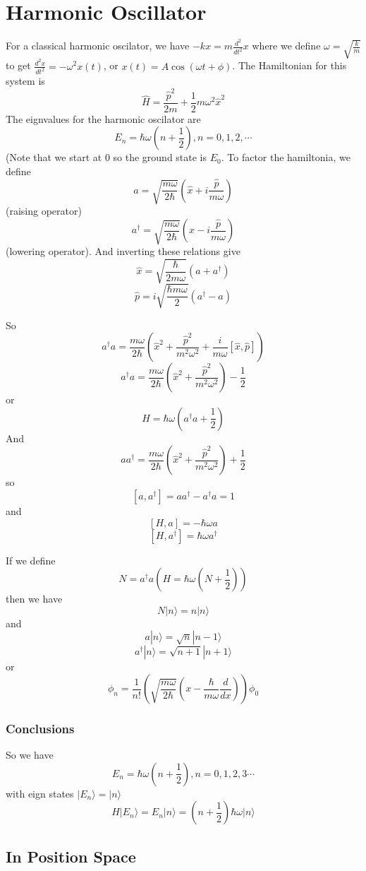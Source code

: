 \documentclass{homework}
\newcommand{\ket}[1]{| #1 \rangle}
\begin{document}
\section{Harmonic Oscillator}

For a classical harmonic oscilator, we have $-kx = m\frac{d^2}{dt^2}x$ where we define $\omega = \sqrt{\frac{k}{m}}$ to get $\frac{d^2x}{dt^2} = -\omega^2 x(t)$, or $x(t) = A\cos(\omega t + \phi)$. The Hamiltonian for this system is 
\[\hat{H} = \frac{\hat{p}^2}{2m} + \frac{1}{2}m\omega^2\hat{x}^2\]
The eignvalues for the harmonic oscilator are
\[E_n = \hbar \omega(n + \frac{1}{2}), n = 0,1,2, \cdots\]
(Note that we start at $0$ so the ground state is $E_0$. To factor the hamiltonia, we define
\[a = \sqrt{\frac{m\omega}{2\hbar}}(\hat{x} + i \frac{\hat{p}}{m\omega})\]
(raising operator)
\[a^{\dagger} = \sqrt{\frac{m\omega}{2\hbar}}(\hat{x} - i \frac{\hat{p}}{m\omega})\]
(lowering operator).  And inverting these relations give
\[\hat{x} = \sqrt{\frac{\hbar}{2m\omega}}(a + a^{\dagger})\]
\[\hat{p} = i\sqrt{\frac{\hbar m \omega}{2}}(a^{\dagger} - a)\]

So 
\[a^{\dagger}a = \frac{m\omega}{2 \hbar}(\hat{x}^2 + \frac{\hat{p}^2}{m^2\omega^2}+ \frac{i}{m\omega}[\hat{x},\hat{p}])\]
\[a^{\dagger}a = \frac{m\omega}{2 \hbar}(\hat{x}^2 + \frac{\hat{p}^2}{m^2\omega^2})  - \frac{1}{2}\]
or
\[H = \hbar \omega (a^{\dagger}a+ \frac{1}{2})\]
And 
\[aa^{\dagger} = \frac{m\omega}{2 \hbar}(\hat{x}^2 + \frac{\hat{p}^2}{m^2\omega^2})  + \frac{1}{2}\]
so
\[[a,a^{\dagger}] = aa^{\dagger} - a^{\dagger}a = 1\]
and
\[[H,a] = -\hbar \omega a\]
\[[H,a^{\dagger}] = \hbar \omega a^{\dagger}\]


If we define
\[N = a^{\dagger}a (H = \hbar \omega(N + \frac{1}{2}))\]
then we have
\[N\ket{n} = n\ket{n}\]
and
\[a\ket{n} = \sqrt{n}\ket{n   - 1}\]
\[a^{\dagger}\ket{n} = \sqrt{n+1}\ket{n  +1}\]
or 
\[\phi_n = \frac{1}{n!}\left( \sqrt{\frac{m\omega}{2\hbar}}(x - \frac{\hbar}{m \omega}\frac{d}{dx})\right)\phi_0\]

\subsubsection{Conclusions}
So we have
\[E_n = \hbar \omega (n + \frac{1}{2}), n = 0,1,2,3 \cdots\]
with eign states $\ket{E_n} = \ket{n}$
\[H\ket{E_n} = E_n \ket{n} = (n + \frac{1}{2})\hbar \omega \ket{n}\]

\subsection{In Position Space}
\end{document}
